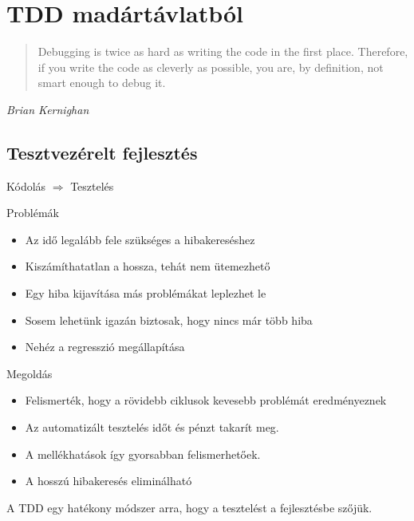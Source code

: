\section{TDD madártávlatból}

\begin{frame}{}
  \begin{quote}
    Debugging is twice as hard as writing the code in the first
    place. Therefore, if you write the code as cleverly as possible,
    you are, by definition, not smart enough to debug it.
  \end{quote}
  \begin{flushright}
    \textit{Brian Kernighan}
  \end{flushright}
\end{frame}

\subsection{Tesztvezérelt fejlesztés}
Kódolás $\Rightarrow$ Tesztelés
\pause

\begin{frame}{Problémák}
  \begin{itemize}[<+->]
  \item Az idő legalább fele szükséges a hibakereséshez
  \item Kiszámíthatatlan a hossza, tehát nem ütemezhető
  \item Egy hiba kijavítása más problémákat leplezhet le
  \item Sosem lehetünk igazán biztosak, hogy nincs már több hiba
  \item Nehéz a regresszió megállapítása
  \end{itemize}
\end{frame}

\begin{frame}{Megoldás}
  \begin{itemize}[<+->]
  \item Felismerték, hogy a rövidebb ciklusok kevesebb problémát eredményeznek
  \item Az automatizált tesztelés időt és pénzt takarít meg.
  \item A mellékhatások így gyorsabban felismerhetőek.
  \item A hosszú hibakeresés eliminálható
  \end{itemize}

  \pause
  A TDD egy hatékony módszer arra, hogy a tesztelést a fejlesztésbe szőjük.
\end{frame}


